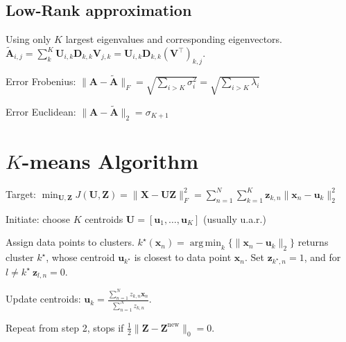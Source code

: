 \documentclass[a4paper, 11pt, landscape]{article}
\DeclareMathOperator*{\argmin}{arg\,min}
\begin{document}
\begin{multicols*}{3}
\subsection{Low-Rank approximation}
Using only $K$ largest eigenvalues and corresponding eigenvectors. $\tilde{\mathbf{A}}_{i, j} = \sum_{k}^K \mathbf{U}_{i, k} \mathbf{D}_{k,k} \mathbf{V}_{j, k} = \mathbf{U}_{i, k} \mathbf{D}_{k,k} (\mathbf{V}^\top)_{k, j}$.
\begin{compactdesc}
	\item[Error Frobenius:] $\|\mathbf{A} - \tilde{\mathbf{A}}\|_F = \sqrt{\sum_{i > K} \sigma_i^2} = \sqrt{\sum_{i > K} \lambda_i}$
	\item[Error Euclidean:] $\|\mathbf{A} - \tilde{\mathbf{A}}\|_2 = \sigma_{K+1}$
\end{compactdesc}

\section{$K$-means Algorithm}
\begin{inparadesc}
	\item[\color{red}Target:] $\min_{\mathbf{U}, \mathbf{Z}} J(\mathbf{U}, \mathbf{Z}) = \|\mathbf{X} - \mathbf{U} \mathbf{Z}\|_F^2 = \sum_{n=1}^N \sum_{k=1}^K \mathbf{z}_{k,n} \|\mathbf{x}_n - \mathbf{u}_k\|_2^2$
\end{inparadesc}
\begin{inparaenum}
	\item Initiate: choose $K$ centroids $\mathbf{U} = [\mathbf{u}_1, \ldots, \mathbf{u}_K]$ (usually u.a.r.)
	\item Assign data points to clusters. $k^\star(\mathbf{x}_n) = \argmin_k \{ \|\mathbf{x}_n - \mathbf{u}_k\|_2 \}$ returns cluster $k^\star$, whose centroid $\mathbf{u}_{k^\star}$ is closest to data point $\mathbf{x}_n$. Set $\mathbf{z}_{k^\star,n} = 1$, and for $ l \neq k^\star~ \mathbf{z}_{l,n}=0$.
	\item Update centroids: $\mathbf{u}_k = \frac{\sum_{n=1}^N z_{k,n} \mathbf{x}_n}{\sum_{n=1}^N z_{k,n}}$.
	\item Repeat from step 2, stops if $\frac{1}{2} \|\mathbf{Z} - \mathbf{Z}^\text{new}\|_0 = 0$.
\end{inparaenum}



\end{multicols*}
\end{document}
